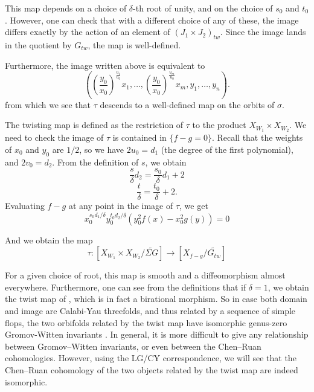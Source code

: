 \documentclass[10pt, letterpaper]{amsart}
\theoremstyle{remark}
\newcommand{\tw}[1]{{#1}_{tw}}
\newcommand{\s}[1]{\Sigma #1}
\newcommand{\nathan}[1]{\todo[color=pistachio,fancyline]{N:#1}}
\begin{document}
This map depends on a choice of $\delta$-th root of unity, and on the choice of $s_0$ and $t_0$. However, one can check that with a different choice of any of these, the image differs exactly by the action of an element of $\tw{(J_1\times J_2)}$. Since the image lands in the quotient by $\tw{G}$, the map is well-defined.


Furthermore, the image written above is equivalent to 
\[
\left(\left(\frac{y_0}{x_0}\right)^{\frac{u_1}{u_0}}x_1, \ldots, \left(\frac{y_0}{x_0}\right)^{\frac{u_m}{u_0}}x_m, y_1, \ldots, y_n\right).
\]
from which we see that $\tau$ descends to a well-defined map on the orbits of $\sigma$. 

The twisting map is defined as the restriction of $\tau$ to the product $X_{W_1}\times X_{W_2}$. We need to check the image of $\tau$ is contained in  $\{f-g=0\}$. Recall that the weights of $x_0$ and $y_0$ are $1/2$, so we have $2u_0=d_1$ (the degree of the first polynomial), and $2v_0=d_2$. From the definition of $s$, we obtain
\[
\frac s\delta d_2=\frac{s_0}{\delta}d_1+2 
\]
\[
\frac t\delta=\frac{t_0}{\delta}+2. 
\]
Evaluating $f-g$ at any point in the image of $\tau$, we get 
\[
x_0^{s_0d_1/\delta}y_0^{t_0d_2/\delta}(y_0^{2}f(x)-x_0^2g(y))=0 
\]

And we obtain the map 
\[
\tau:[X_{W_1}\times X_{W_2}/\widetilde{\s{G}}]\to [X_{f-g}/\widetilde{\tw{G}}]
\]


For a given choice of root, this map is smooth and a diffeomorphism almost everywhere. Furthermore, one can see from the definitions that if $\delta=1$, we obtain the twist map of \cite{ABS}, which is in fact a birational morphism.  %
So in case both domain and image are Calabi-Yau threefolds, and thus related by a sequence of simple flops, the two orbifolds related by the twist map have isomorphic genus-zero Gromov-Witten invariants \nathan{citation?}. In general, it is more difficult to give any relationship between Gromov--Witten invariants, or even between the Chen--Ruan cohomologies. However, using the LG/CY correspondence, we will see that the Chen--Ruan cohomology of the two objects related by the twist map are indeed isomorphic. 
\end{document}
